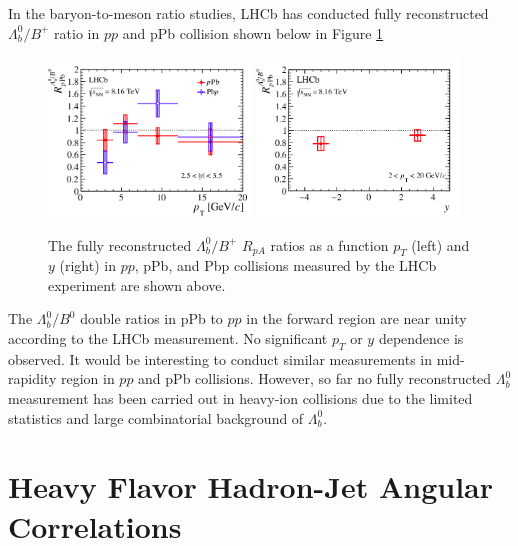 In the baryon-to-meson ratio studies, LHCb has conducted fully reconstructed $\Lambda_b^0/B^+$ ratio in $pp$ and pPb collision \cite{LHCbLambdaB} shown below in Figure \ref{LHCbLambda}


\begin{figure}[hbtp]
\begin{center}
\includegraphics[width=0.48\textwidth]{Figures/Chapter2/LHCbRpAPt.png}
\includegraphics[width=0.48\textwidth]{Figures/Chapter2/LHCbRpAy.png}
\caption{The fully reconstructed $\Lambda_b^0/B^+$ $R_{pA}$ ratios as a function $p_T$ (left) and $y$ (right) in $pp$, pPb, and Pbp collisions measured by the LHCb experiment are shown above.}
\label{LHCbLambda}
\end{center}
\end{figure}   

The $\Lambda_b^0/B^0$ double ratios in pPb to $pp$ in the forward region are near unity according to the LHCb measurement. No significant $p_T$ or $y$ dependence is observed. It would be interesting to conduct similar measurements in mid-rapidity region in $pp$ and pPb collisions. However, so far no fully reconstructed $\Lambda_b^0$ measurement has been carried out in heavy-ion collisions due to the limited statistics and large combinatorial background of $\Lambda_b^0$. 



\section{Heavy Flavor Hadron-Jet Angular Correlations}

